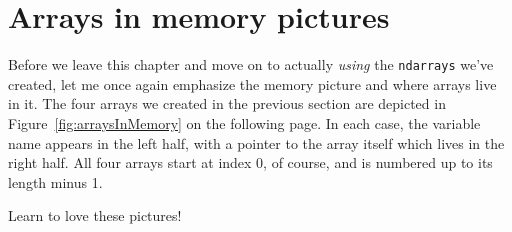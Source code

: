 \section{Arrays in memory pictures}


Before we leave this chapter and move on to actually \textit{using} the
\texttt{ndarrays} we've created, let me once again emphasize the memory picture
and where arrays live in it. The four arrays we created in the previous section
are depicted in Figure~\ref{fig:arraysInMemory} on the following page. In each
case, the variable name appears in the left half, with a pointer to the array
itself which lives in the right half. All four arrays start at index 0, of
course, and is numbered up to its length minus 1.

Learn to love these pictures!
